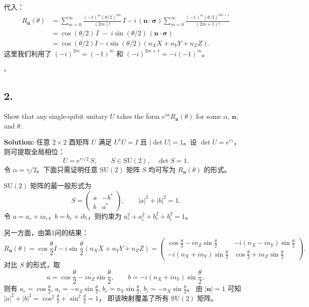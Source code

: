 \documentclass{ctexart}
\begin{document}
代入：
\begin{align*}
    R_{\mathbf{n}}(\theta)
    &= \sum_{m=0}^{\infty} \frac{(-1)^m (\theta/2)^{2m}}{(2m)!}\, I
       - i\,(\mathbf{n}\cdot\boldsymbol{\sigma}) \sum_{m=0}^{\infty} \frac{(-1)^m (\theta/2)^{2m+1}}{(2m+1)!} \\
    &= \cos(\theta/2)\,I \;-\; i\sin(\theta/2)\,(\mathbf{n}\cdot\boldsymbol{\sigma}) \\
    &= \cos(\theta/2)I - i\sin(\theta/2)(n_X X + n_Y Y + n_Z Z).
\end{align*}
这里我们利用了 $(-i)^{2m} = (-1)^m$ 和 $(-i)^{2m+1} = -i(-1)^m$。

\hfill $\square$

\subsection*{2.}
Show that any single-qubit unitary $U$ takes the form $e^{i\alpha}R_{\mathbf{n}}(\theta)$ for some $\alpha$, $\mathbf{n}$, and $\theta$.

\medskip
\noindent\textbf{Solution:}
任意 $2\times 2$ 酉矩阵 $U$ 满足 $U^\dagger U = I$ 且 $|\det U| = 1$。设 $\det U = e^{i\gamma}$，
则可提取全局相位：
\begin{equation*}
    U = e^{i\gamma/2} \, S, \qquad S \in \mathrm{SU}(2),\quad \det S = 1.
\end{equation*}
令 $\alpha = \gamma/2$。下面只需证明任意 $\mathrm{SU}(2)$ 矩阵 $S$ 均可写为 $R_{\mathbf{n}}(\theta)$ 的形式。

$\mathrm{SU}(2)$ 矩阵的最一般形式为
\begin{equation*}
    S = \begin{pmatrix}
        a & -b^* \\[2pt]
        b & a^*
    \end{pmatrix}, \qquad |a|^2 + |b|^2 = 1.
\end{equation*}
令 $a = a_r + i a_i$，$b = b_r + i b_i$，则约束为 $a_r^2 + a_i^2 + b_r^2 + b_i^2 = 1$。

另一方面，由第1问的结果：
\begin{equation*}
    R_{\mathbf{n}}(\theta)
    = \cos\frac{\theta}{2} I - i\sin\frac{\theta}{2}(n_X X + n_Y Y + n_Z Z)
    = \begin{pmatrix}
        \cos\frac{\theta}{2} - i n_Z \sin\frac{\theta}{2} & -i(n_X - i n_Y)\sin\frac{\theta}{2} \\[4pt]
        -i(n_X + i n_Y)\sin\frac{\theta}{2} & \cos\frac{\theta}{2} + i n_Z \sin\frac{\theta}{2}
    \end{pmatrix}.
\end{equation*}
对比 $S$ 的形式，取
\begin{equation*}
    a = \cos\frac{\theta}{2} - i n_Z \sin\frac{\theta}{2}, \qquad
    b = -i(n_X + i n_Y)\sin\frac{\theta}{2},
\end{equation*}
则有 $a_r = \cos\frac{\theta}{2}$, $a_i = -n_Z\sin\frac{\theta}{2}$, $b_r = n_Y\sin\frac{\theta}{2}$, $b_i = -n_X\sin\frac{\theta}{2}$。
由 $|\mathbf{n}|=1$ 可知 $|a|^2+|b|^2 = \cos^2\frac{\theta}{2} + \sin^2\frac{\theta}{2} = 1$，
即该映射覆盖了所有 $\mathrm{SU}(2)$ 矩阵。
\end{document}
